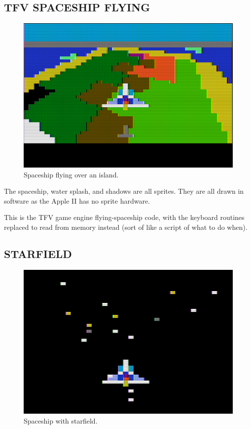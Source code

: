 \documentclass[twocolumn]{article}
\begin{document}
\subsection{TFV SPACESHIP FLYING}

\begin{figure}[tb]
\begin{center}
\includegraphics[width=\columnwidth]{figures/m7_screen4.jpg}
\end{center}
\caption{Spaceship flying over an island.\label{fig:tb1}}
\end{figure}

The spaceship, water splash, and shadows are all sprites.
They are all drawn in software as the Apple II has no sprite hardware.

  This is the TFV game engine flying-spaceship code, with the keyboard
  routines replaced to read from memory instead (sort of like a script
  of what to do when). 

\subsection{STARFIELD}

\begin{figure}[tb]
\begin{center}
\includegraphics[width=\columnwidth]{figures/m7_screen3.jpg}
\end{center}
\caption{Spaceship with starfield.\label{fig:stars}}
\end{figure}
\end{document}
